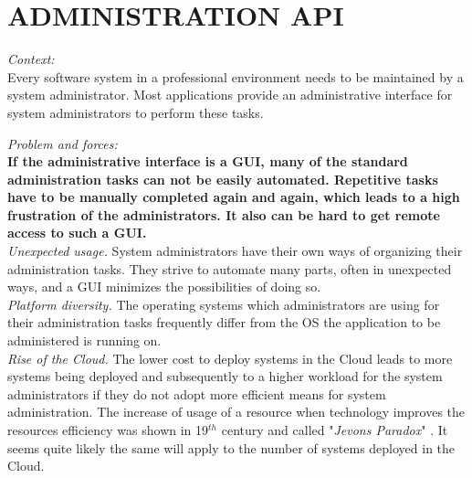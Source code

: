 \newpage

\section*{ADMINISTRATION API}

\textit{Context:}\\
Every software system in a professional environment needs to be maintained by a system administrator.
Most applications provide an administrative interface for system administrators to perform these tasks.
\begin{center}
  
\end{center}
\textit{Problem and forces:\\}
\textbf{If the administrative interface is a GUI, many of the standard administration tasks can not be easily automated. Repetitive tasks have to be manually completed again and again, which leads to a high frustration of the administrators. It also can be hard to get remote access to such a GUI.}\\

\textit{Unexpected usage.} System administrators have their own ways of organizing their administration tasks. They strive to automate many parts, often in unexpected ways, and a GUI minimizes the possibilities of doing so.\\

\textit{Platform diversity.} The operating systems which administrators are using for their administration tasks frequently
differ from the OS the application to be administered is running on.\\

\textit{Rise of the Cloud.} The lower cost to deploy systems in the Cloud leads to more systems being deployed and subsequently to a higher workload for the system administrators if they do not adopt more efficient means for system administration. 
The increase of usage of a resource when technology improves the resources
efficiency was shown in 19$^{th}$ century and called "\textit{Jevons Paradox}" \cite{Polimeni2008}. It seems quite likely the same will apply to the number of systems deployed in the Cloud.\\

